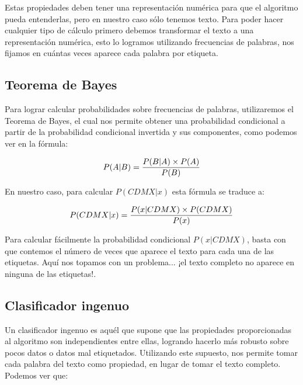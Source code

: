 Estas propiedades deben tener una representación numérica para que el algoritmo pueda entenderlas, pero en nuestro caso sólo tenemos texto. Para poder hacer cualquier tipo de cálculo primero debemos transformar el texto a una representación numérica, esto lo logramos utilizando frecuencias de palabras, nos fijamos en cuántas veces aparece cada palabra por etiqueta.

\subsection{Teorema de Bayes}

Para lograr calcular probabilidades sobre frecuencias de palabras, utilizaremos el Teorema de Bayes, el cual nos permite obtener una probabilidad condicional a partir de la probabilidad condicional invertida y sus componentes, como podemos ver en la fórmula:

\[ P( A | B ) = {{P( B | A ) \times P(A)} \over P(B)} \]

En nuestro caso, para calcular \(P( CDMX | x )\) esta fórmula se traduce a:

\[ P( CDMX | x ) = {{P( x | CDMX ) \times P(CDMX)} \over P(x)} \]





Para calcular fácilmente la probabilidad condicional \(P(x | CDMX)\), basta con que contemos el número de veces que aparece el texto  para cada una de las etiquetas. Aquí nos topamos con un problema... ¡el texto completo no aparece en ninguna de las etiquetas!.

\subsection{Clasificador ingenuo}

Un clasificador ingenuo es aquél que supone que las propiedades proporcionadas al algoritmo son independientes entre ellas, logrando hacerlo más robusto sobre pocos datos o datos mal etiquetados.
Utilizando este supuesto, nos permite tomar cada palabra del texto como propiedad, en lugar de tomar el texto completo. Podemos ver que: 

